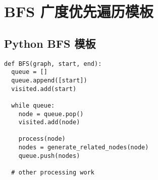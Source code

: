 \newpage
\section{BFS 广度优先遍历模板}

\subsection{Python BFS 模板}

\begin{verbatim}
def BFS(graph, start, end):
  queue = []
  queue.append([start])
  visited.add(start)

  while queue:
    node = queue.pop()
    visited.add(node)

    process(node)
    nodes = generate_related_nodes(node)
    queue.push(nodes)

  # other processing work
\end{verbatim}
